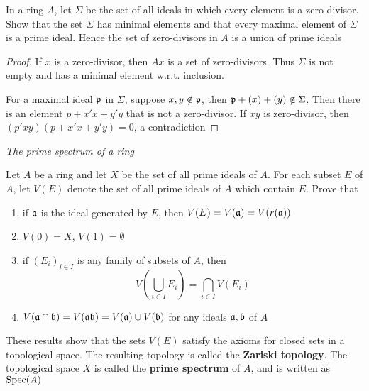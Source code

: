 \documentclass[11pt]{article}
\begin{document}
\begin{exercise}
\label{ex1.14}
In a ring \(A\), let \(\Sigma\) be the set of all ideals in which every element is a zero-divisor. Show
that the set \(\Sigma\) has minimal elements and that every maximal element of \(\Sigma\) is a prime ideal. Hence
the set of zero-divisors in \(A\) is a union of prime ideals
\end{exercise}

\begin{proof}
If \(x\) is a zero-divisor, then \(Ax\) is a set of zero-divisors. Thus \(\Sigma\) is not empty and has a
minimal element w.r.t. inclusion.

For a maximal ideal \(\mathfrak{p}\) in \(\Sigma\), suppose \(x,y\notin\mathfrak{p}\), then \(\mathfrak{p}+(x)+(y)\notin\Sigma\). Then there is an
element \(p+x'x+y'y\) that is not a zero-divisor. If \(xy\) is zero-divisor,
then \((p'xy)(p+x'x+y'y)=0\), a contradiction
\end{proof}

\emph{The prime spectrum of a ring}

\begin{exercise}
\label{ex1.15}
Let \(A\) be a ring and let \(X\) be the set of all prime ideals of \(A\). For each subset \(E\)
of \(A\), let \(V(E)\) denote the set of all prime ideals of \(A\) which contain \(E\). Prove
that
\begin{enumerate}
\item if \(\mathfrak{a}\) is the ideal generated by \(E\), then \(V(E)=V(\mathfrak{a})=V(r(\mathfrak{a}))\)
\item \(V(0)=X\), \(V(1)=\emptyset\)
\item if \((E_i)_{i\in I}\) is any family of subsets of \(A\), then
\begin{equation*}
V\left( \bigcup_{i\in I}E_i \right)=\bigcap_{i\in I}V(E_i)
\end{equation*}
\item \(V(\mathfrak{a}\cap\mathfrak{b})=V(\mathfrak{a}\mathfrak{b})=V(\mathfrak{a})\cup V(\mathfrak{b})\) for any ideals \(\mathfrak{a},\mathfrak{b}\) of \(A\)
\end{enumerate}


These results show that the sets \(V(E)\) satisfy the axioms for closed sets in a topological
space. The resulting topology is called the \textbf{Zariski topology}. The topological space \(X\) is
called the \textbf{prime spectrum} of \(A\), and is written as \(\operatorname{Spec}(A)\)
\end{exercise}
\end{document}
